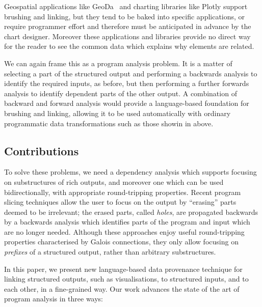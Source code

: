 Geospatial applications like GeoDa~\cite{anselin06} and charting libraries like Plotly support brushing and linking, but they tend to be baked into specific applications, or require programmer effort and therefore must be anticipated in advance by the chart designer. Moreover these applications and libraries provide no direct way for the reader to see the common data which explains why elements are related.

We can again frame this as a program analysis problem. It is a matter of selecting a part of the structured output and performing a backwards analysis to identify the required inputs, as before, but then performing a further forwards analysis to identify dependent parts of the other output. A combination of backward and forward analysis would provide a language-based foundation for brushing and linking, allowing it to be used automatically with ordinary programmatic data transformations such as those showin in  above.

\subsection{Contributions}

To solve these problems, we need a dependency analysis which supports focusing on substructures of rich outputs, and moreover one which can be used bidirectionally, with appropriate round-tripping properties. Recent program slicing techniques \cite{perera12a,perera13a,ricciotti17} allow the user to focus on the output by ``erasing'' parts deemed to be irrelevant; the erased parts, called \emph{holes}, are propagated backwards by a backwards analysis which identifies parts of the program and input which are no longer needed. Although these approaches enjoy useful round-tripping properties characterised by Galois connections, they only allow focusing on \emph{prefixes} of a structured output, rather than arbitrary substructures.

In this paper, we present new language-based data provenance technique for linking structured outputs, such as visualisations, to structured inputs, and to each other, in a fine-grained way. Our work advances the state of the art  of program analysis in three ways:

